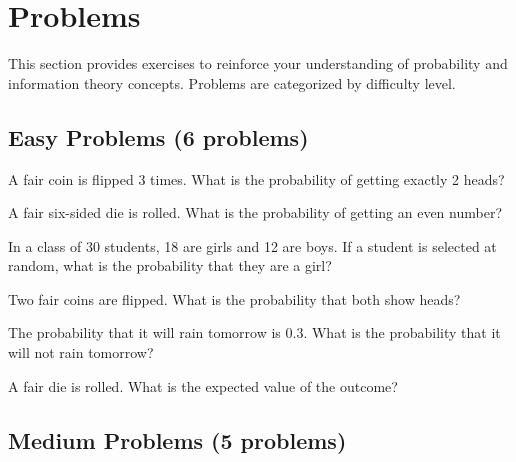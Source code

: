 
\section{Problems}
\label{sec:probability-problems}

This section provides exercises to reinforce your understanding of probability and information theory concepts. Problems are categorized by difficulty level.

\subsection{Easy Problems (6 problems)}

\begin{problem}
A fair coin is flipped 3 times. What is the probability of getting exactly 2 heads?
\end{problem}

\begin{problem}
A fair six-sided die is rolled. What is the probability of getting an even number?
\end{problem}

\begin{problem}
In a class of 30 students, 18 are girls and 12 are boys. If a student is selected at random, what is the probability that they are a girl?
\end{problem}

\begin{problem}
Two fair coins are flipped. What is the probability that both show heads?
\end{problem}

\begin{problem}
The probability that it will rain tomorrow is 0.3. What is the probability that it will not rain tomorrow?
\end{problem}

\begin{problem}
A fair die is rolled. What is the expected value of the outcome?
\end{problem}

\subsection{Medium Problems (5 problems)}


